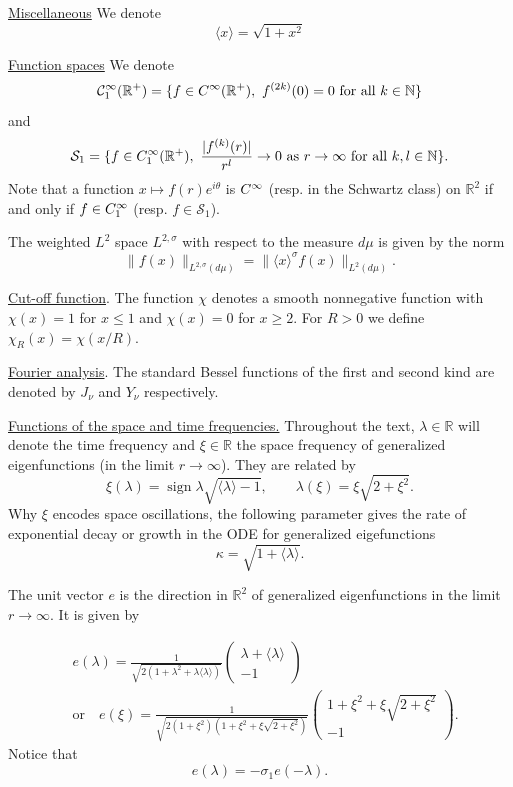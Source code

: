 \documentclass[11 pt]{amsart}
\theoremstyle{definition}
\theoremstyle{remark}
\numberwithin{equation}{section}
\begin{document}
\medskip
\noindent
\underline{Miscellaneous} We denote
$$
\langle x \rangle = \sqrt{1 + x^2}
$$

\medskip
\noindent
\underline{Function spaces} We denote
$$
\mathcal C_1^\infty(\mathbb R^+)=\{f \in \mathcal \mathcal{C}^\infty(\mathbb R^+), \ f^{(2k)}(0)=0 \mbox{ for all }k\in \mathbb N\}
$$
and
$$
\mathcal S_1=\{f \in \mathcal \mathcal{C}^\infty_1(\mathbb R^+), \ \frac{|f^{(k)}(r)|}{r^l}\to 0 \mbox{ as }r\to \infty   \mbox{ for all }k,l\in \mathbb N\}.
$$
Note that a function $x\mapsto f(r)e^{i\theta}$ is $\mathcal \mathcal{C}^\infty$ (resp. in the Schwartz class) on $\mathbb R^2$ if and only if $f\in \mathcal \mathcal{C}^\infty_1$ (resp. $f\in \mathcal S_1$). 

The weighted $L^2$ space $L^{2,\sigma}$ with respect to the measure $d\mu$ is given by the norm
$$
\| f(x) \|_{L^{2,\sigma}(d\mu)} = \| \langle x \rangle^\sigma f(x) \|_{L^2(d\mu)}.
$$

\medskip
\noindent
\underline{Cut-off function}. The function $\chi$ denotes a smooth nonnegative function with $\chi(x)=1$ for $x\leq 1$ and $\chi(x)=0$ for $x\geq 2$. For $R>0$ we define $\chi_R(x)=\chi(x/R)$.

\medskip

\noindent
\underline{Fourier analysis}. The standard Bessel functions of the first and second kind are denoted by $J_\nu$ and $Y_\nu$ respectively.

\medskip

\noindent
\underline{Functions of the space and time frequencies.} Throughout the text, $\lambda \in \mathbb{R}$ will denote the time frequency and $\xi \in \mathbb{R}$ the space frequency of generalized eigenfunctions (in the limit $r \to \infty$). They are related by
$$
\xi(\lambda) = \operatorname{sign} \lambda \sqrt{\langle \lambda \rangle - 1}, \qquad \lambda(\xi) = \xi \sqrt{2 + \xi^2}.
$$
Why $\xi$ encodes space oscillations, the following parameter gives the rate of exponential decay or growth in the ODE for generalized eigefunctions
$$
\kappa = \sqrt{1 + \langle  \lambda \rangle}.
$$

The unit vector $e$ is the direction in $\mathbb{R}^2$ of generalized eigenfunctions in the limit $r \to \infty$. It is given by


\begin{align*}
& e(\lambda) = \frac{1}{\sqrt{2 \left( 1 + \lambda^2 + \lambda
   \langle \lambda \rangle \right)}} \left(\begin{array}{c}
     \lambda + \langle \lambda \rangle\\ - 1
   \end{array}\right) \\
& \mbox{or} \quad e(\xi) = \frac{1}{\sqrt{2(1 + \xi^2)(1 + \xi^2 + \xi \sqrt{2 + \xi^2})}} \begin{pmatrix} 1+ \xi^2 + \xi \sqrt{2 + \xi^2} \\ -1 \end{pmatrix}.
\end{align*}
Notice that
$$
e(\lambda) = -\sigma_1 e(-\lambda).
$$
\end{document}
